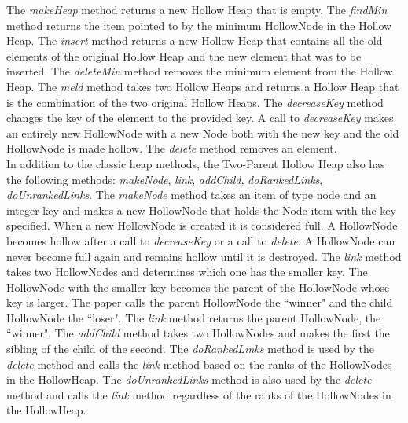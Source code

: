 \documentclass[letter,10pt]{article}
\begin{document}
\quad The \textit{makeHeap} method returns a new Hollow Heap that is empty. The \textit{findMin} method returns the item pointed to by the minimum HollowNode in the Hollow Heap. The \textit{insert} method returns a new Hollow Heap that contains all the old elements of the original Hollow Heap and the new element that was to be inserted. The \textit{deleteMin} method removes the minimum element from the Hollow Heap. The \textit{meld} method takes two Hollow Heaps and returns a Hollow Heap that is the combination of the two original Hollow Heaps. The \textit{decreaseKey} method changes the key of the element to the provided key. A call to \textit{decreaseKey} makes an entirely new HollowNode with a new Node both with the new key and the old HollowNode is made hollow. The \textit{delete} method removes an element.\\ 

\quad In addition to the classic heap methods, the Two-Parent Hollow Heap also has the following methods: \textit{makeNode}, \textit{link}, \textit{addChild}, \textit{doRankedLinks}, \textit{doUnrankedLinks}. The \textit{makeNode} method takes an item of type node and an integer key and makes a new HollowNode that holds the Node item with the key specified. When a new HollowNode is created it is considered full.  A HollowNode becomes hollow after a call to \textit{decreaseKey} or a call to \textit{delete}. A HollowNode can never become full again and remains hollow until it is destroyed. The \textit{link} method takes two HollowNodes and determines which one has the smaller key. The HollowNode with the smaller key becomes the parent of the HollowNode whose key is larger. The paper calls the parent HollowNode the ``winner" and the child HollowNode the ``loser". The \textit{link} method returns the parent HollowNode, the ``winner". The \textit{addChild} method takes two HollowNodes and makes the first the sibling of the child of the second. The \textit{doRankedLinks} method is used by the \textit{delete} method and calls the \textit{link} method based on the ranks of the HollowNodes in the HollowHeap. The \textit{doUnrankedLinks} method is also used by the \textit{delete} method and calls the \textit{link} method regardless of the ranks of the HollowNodes in the HollowHeap. 
\end{document}
